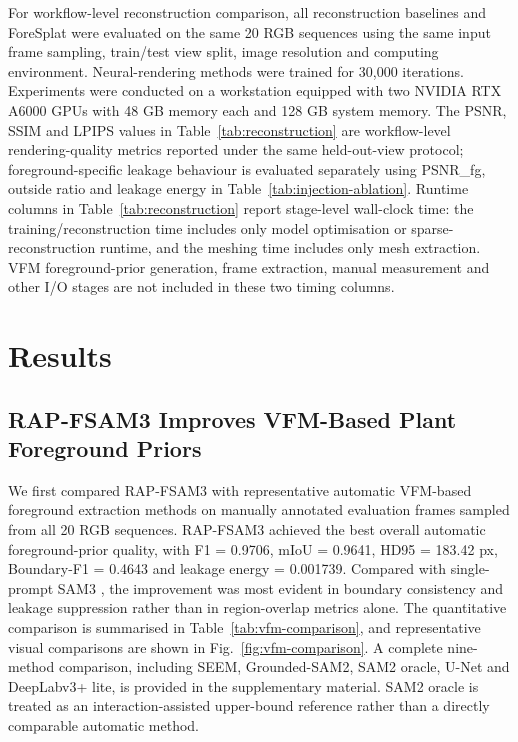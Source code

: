 \documentclass[a4paper]{cas-sc}
\begin{document}
For workflow-level reconstruction comparison, all reconstruction baselines and ForeSplat were evaluated on the same 20 RGB sequences using the same input frame sampling, train/test view split, image resolution and computing environment. Neural-rendering methods were trained for 30,000 iterations. Experiments were conducted on a workstation equipped with two NVIDIA RTX A6000 GPUs with 48 GB memory each and 128 GB system memory. The PSNR, SSIM and LPIPS values in Table~\ref{tab:reconstruction} are workflow-level rendering-quality metrics reported under the same held-out-view protocol; foreground-specific leakage behaviour is evaluated separately using PSNR\_fg, outside ratio and leakage energy in Table~\ref{tab:injection-ablation}. Runtime columns in Table~\ref{tab:reconstruction} report stage-level wall-clock time: the training/reconstruction time includes only model optimisation or sparse-reconstruction runtime, and the meshing time includes only mesh extraction. VFM foreground-prior generation, frame extraction, manual measurement and other I/O stages are not included in these two timing columns.

\section{Results}\label{sec:results}

\subsection{RAP-FSAM3 Improves VFM-Based Plant Foreground Priors}\label{sec:vfm-baseline-results}

We first compared RAP-FSAM3 with representative automatic VFM-based foreground extraction methods on manually annotated evaluation frames sampled from all 20 RGB sequences. RAP-FSAM3 achieved the best overall automatic foreground-prior quality, with F1 = 0.9706, mIoU = 0.9641, HD95 = 183.42 px, Boundary-F1 = 0.4643 and leakage energy = 0.001739. Compared with single-prompt SAM3 \cite{ref71}, the improvement was most evident in boundary consistency and leakage suppression rather than in region-overlap metrics alone. The quantitative comparison is summarised in Table~\ref{tab:vfm-comparison}, and representative visual comparisons are shown in Fig.~\ref{fig:vfm-comparison}. A complete nine-method comparison, including SEEM, Grounded-SAM2, SAM2 oracle, U-Net and DeepLabv3+ lite, is provided in the supplementary material. SAM2 oracle is treated as an interaction-assisted upper-bound reference rather than a directly comparable automatic method.
\end{document}
